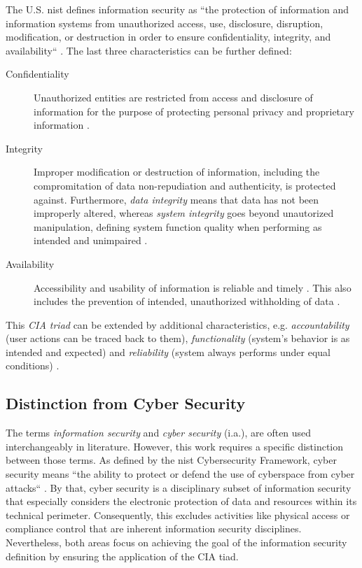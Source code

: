 The U.S. \acf{nist} defines information security as ``the protection of information and information systems from unauthorized access, use, disclosure, disruption, modification, or destruction in order to ensure confidentiality, integrity, and availability`` \cite{nieles_introduction_2017}. The last three characteristics can be further defined:
		
	\begin{description}
		\item[Confidentiality] Unauthorized entities are restricted from access and disclosure of information for the purpose of protecting personal privacy and proprietary information \cite{nieles_introduction_2017}.
		\item[Integrity] Improper modification or destruction of information, including the compromitation of data non-repudiation and authenticity, is protected against. Furthermore, \textit{data integrity} means that data has not been improperly altered, whereas \textit{system integrity} goes beyond unautorized manipulation, defining system function quality when performing as intended and unimpaired \cite{nieles_introduction_2017}.
		\item[Availability] Accessibility and usability of information is reliable and timely \cite{nieles_introduction_2017}. This also includes the prevention of intended, unauthorized withholding of data \cite[p. 36]{fischer-hubner_it-security_2001}.
	\end{description}
		
	This \textit{CIA triad} can be extended by additional characteristics, e.g. \textit{accountability} (user actions can be traced back to them), \textit{functionality} (system's behavior is as intended and expected) and \textit{reliability} (system always performs under equal conditions) \cite[p. 36 sq.]{fischer-hubner_it-security_2001}.
 
\subsection{Distinction from Cyber Security} \label{subs:foundations-security-distinction}

The terms \textit{information security} and \textit{cyber security} (i.a.), are often used interchangeably in literature. However, this work requires a specific distinction between those terms. As defined by the \ac{nist} Cybersecurity Framework, cyber security means ``the ability to protect or defend the use of cyberspace from cyber attacks`` \cite{noauthor_framework_2018}. By that, cyber security is a disciplinary subset of information security that especially considers the electronic protection of data and resources within its technical perimeter. Consequently, this excludes activities like physical access or compliance control that are inherent information security disciplines. Nevertheless, both areas focus on achieving the goal of the information security definition by ensuring the application of the CIA tiad.

